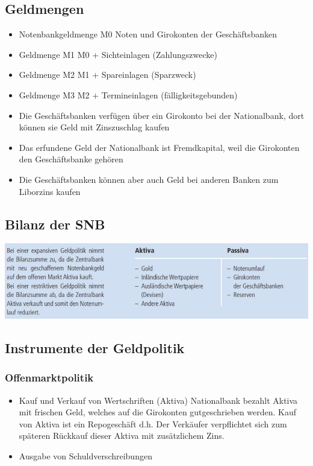 \subsection{Geldmengen}
\begin{itemize}
	\item Notenbankgeldmenge M0
	\subitem Noten und Girokonten der Geschäftsbanken
	\item Geldmenge M1
	\subitem M0 + Sichteinlagen (Zahlungszwecke)
	\item Geldmenge M2
	\subitem M1 + Spareinlagen (Sparzweck)
	\item Geldmenge M3
	\subitem M2 + Termineinlagen (fälligkeitsgebunden)
	\item Die Geschäftsbanken verfügen über ein Girokonto bei der Nationalbank, dort können sie Geld mit Zinszuschlag kaufen
	\item Das erfundene Geld der Nationalbank ist Fremdkapital, weil die Girokonten den Geschäftsbanke gehören
	\item Die Geschäftsbanken können aber auch Geld bei anderen Banken zum Liborzins kaufen
\end{itemize}
\subsection{Bilanz der SNB}
\includegraphics[width=18cm]{images/snb.jpg}
\subsection{Instrumente der Geldpolitik}
\subsubsection{Offenmarktpolitik}
\begin{itemize}
	\item Kauf und Verkauf von Wertschriften (Aktiva)
	\subitem Nationalbank bezahlt Aktiva mit frischen Geld, welches auf die Girokonten gutgeschrieben werden.
    \subitem Kauf von Aktiva ist ein Repogeschäft d.h. Der Verkäufer verpflichtet sich zum späteren Rückkauf
    \subitem dieser Aktiva mit zusätzlichem Zins.
	\item Ausgabe von Schuldverschreibungen 
\end{itemize}
